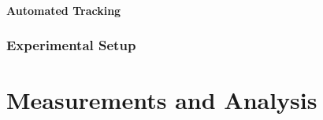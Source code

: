\documentclass[]{report}
\begin{document}


\subsection{Automated Tracking}
     

\section{Experimental Setup}




%
%
%

	

%

%

\part{Measurements and Analysis}
\end{document}
